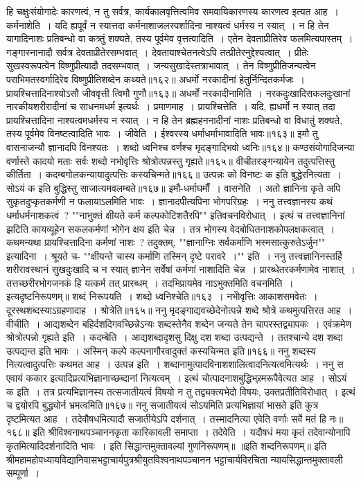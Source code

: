 हि चक्षुःसंयोगादेः कारणत्वं, न तु सर्वत्र, कार्यकालवृत्तित्वमिव समवायिकारणस्य कारणत्व इत्यत आह~। कर्मनाशेति~। यदि ह्यपूर्वं न स्यात्तदा कर्मनाशाजलस्पर्शादिना
नाश्यत्वं धर्मस्य न स्यात्~। न हि तेन यागादिनाशः प्रतिबन्धो वा कत्र्तुं शक्यते, तस्य पूर्वमेव वृत्तत्वादिति~।
एतेन देवताप्रीतिरेव फलमित्यपास्तम्~। गङ्गास्नानादौ सर्वत्र देवताप्रीतेरसम्भवात्~। देवतायाश्चेतनत्वेऽपि तत्प्रीतेरनुद्देश्यत्वात्~। प्रीतेः सुखस्वरूपत्वेन
विष्णुप्रीत्यादौ तदसम्भवात्~। जन्यसुखादेस्तत्राभावात्~। तेन विष्णुप्रीतिजन्यत्वेन पराभिमतस्वर्गादिरेव विष्णुप्रीतिशब्देन कथ्यते॥१६२॥
अधर्मो नरकादीनां हेतुर्निन्दितकर्मजः~।
प्रायश्चित्तादिनाश्योऽसौ जीववृत्ती त्विमौ गुणौ॥१६३॥
अधर्मो नरकादीनामिति~। नरकदुःखादिसकलदुःखानां नारकीयशरीरादीनां च साधनमधर्म इत्यर्थः~। प्रमाणमाह~। प्रायश्चित्तेति~। यदि, ह्यधर्मो न स्यात् तदा
प्रायश्चित्तादिना नाश्यत्वमधर्मस्य न स्यात्~। न हि तेन ब्रह्महननादीनां नाशः प्रतिबन्धो वा विधातुं शक्यते, तस्य पूर्वमेव विनष्टत्वादिति भावः~। जीवेति~। ईश्वरस्य
धर्माधर्माभावादिति भावः॥१६३॥
इमौ तु वासनाजन्यौ ज्ञानादपि विनश्यतः~।
शब्दो ध्वनिश्च वर्णश्च मृदङ्गादिभवो ध्वनिः॥१६४॥
कण्ठसंयोगादिजन्या वर्णास्ते कादयो मताः
सर्वः शब्दो नभोवृत्तिः श्रोत्रोत्पन्नस्तु गृह्यते॥१६५॥
वीचीतरङ्गन्यायेन तदुत्पत्तिस्तु कीर्तिता~।
कदम्बगोलकन्यायादुत्पत्तिः कस्यचिन्मते॥१६६॥
उत्पन्नः को विनष्टः क इति बुद्धेरनित्यता~।
सोऽयं क इति बुद्धिस्तु साजात्यमवलम्बते॥१६७॥
इमौ-धर्माघर्मौं~। वासनेति~। अतो ज्ञानिना कृते अपि सुकृतदुप्कृतकर्मणी न फलायाऽलमिति भावः~। ज्ञानादपीत्यपिना भोगपरिग्रहः~। ननु तत्त्वज्ञानस्य कथं
धर्माधर्मनाशकत्वं~? ""नाभुक्तं क्षीयते कर्म कल्पकोटिशतैरपि"" इतिवचनविरोधात्~। इत्थं च तत्त्वज्ञानिनां झटिति कायव्यूहेन सकलकर्मणां भोगेन क्षय इति चेन्न~। तत्र
भोगस्य वेदबोधितनाशकोपलक्षकत्वात्~। कथमन्यथा प्रायश्चित्तादिना कर्मणां नाशः~? तदुक्तम्, ""ज्ञानाग्निः सर्वकर्माणि भस्मसात्कुरुतेऽर्जुन"" इत्यादिना~। श्रूयते च-
""क्षीयन्ते चास्य कर्माणि तस्मिन् दृष्टे परावरे~।"" इति~।
ननु तत्त्वज्ञानिनस्तर्हि शरीरावस्थानं सुखदुःखादि च न स्यात् ज्ञानेन सर्वेषां कर्मणां नाशादिति चेन्न~। प्रारब्धेतरकर्मणामेव नाशात्~। तत्तच्छरीरभोगजनकं हि यत्कर्म
तत् प्रारब्धम्~। तदभिप्रायमेव नाऽभुक्तमिति वचनमिति~। इत्यदृष्टनिरूपणम्॥
शब्दं निरूपयति~। शब्दो ध्वनिश्चेति॥१६३~।
नभोेवृत्तिः आकाशसमवेतः~। दूरस्थशब्दस्याऽग्रहणादाह~। श्रोत्रेति॥१६५॥
ननु मृदङ्गाद्यवच्छेदेनोत्पन्ने शब्दे श्रोत्रे कथमुत्पत्तिरत आह~। वीचीति~। आद्यशब्देन बहिर्दशदिगवच्छिन्नेऽन्यः शब्दस्तेनैव शब्देन जन्यते तेन चापरस्तद्व्यापकः~।
एवंक्रमेण श्रोत्रोत्पन्नो गृह्यते इति~। कदम्बेति~। आद्यशब्दादृशसु दिक्षु दश शब्दा उत्पद्यन्ते~। ततश्चान्ये दश शब्दा उत्पद्यन्त इति भावः~। अस्मिन् कल्पे कल्पनागौरवादुक्तं
कस्यचिन्मत इति॥१६६॥
ननु शब्दस्य नित्यत्वादुत्पत्तिः कथमत आह~। उत्पन्न इति~। शब्दानामुत्पादविनाशशालित्वादनित्यत्वमित्यर्थः~। ननु स एवायं ककार इत्यादिप्रत्यभिज्ञानाच्छब्दानां
नित्यत्वम्~। इत्थं चोत्पादनाशबुद्धिभ्र्रमरूपैवेत्यत आह~। सोऽयं क इति~। तत्र प्रत्यभिज्ञानस्य तत्सजातीयत्वं विषयो न तु तद्व्यक्त्यभेदो विषयः, उक्तप्रतीतिविरोधात्~। इत्थं
च द्वयोरपि बुद्ध्योर्न भ्रमत्वमिति॥१६७॥
ननु सजातीयत्वं सोऽयमिति प्रत्यभिज्ञायां भासते इति कुत्र दृष्टमित्यत आह~।
तदेवौषधमित्यादौ सजातीयेऽपि दर्शनात्~।
तस्मादनित्या एवेति वर्णाः सर्वे मतं हि नः॥१६८॥
इति श्रीविश्वनाथपञ्चाननकृता कारिकावली समाप्ता~।
तदेवेति~। यदौषधं मया कृतं तदेवान्योनापि कृतमित्यादिदर्शनादिति भावः~।
इति सिद्धान्तमुक्तावल्यां गुणनिरूपणम्॥
॥इति शब्दनिरूपणम्॥
इति श्रीमहामहोपध्यायविद्यानिवासभट्टाचार्यपुत्रश्रीयुतविश्वनाथपञ्चानन
भट्टाचार्यविरचिता न्यायसिद्धान्तमुक्तावली सम्पूर्णा~।
